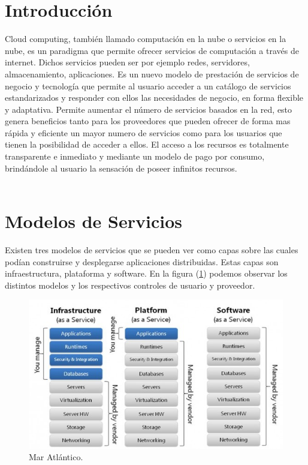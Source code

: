 \section{Introducción}
Cloud computing, también llamado computación en la nube o servicios en la nube, es un paradigma que permite ofrecer servicios de computación a través de internet. Dichos servicios pueden ser por ejemplo redes, servidores, almacenamiento, aplicaciones.
Es un nuevo modelo de prestación de servicios de negocio y tecnología que permite al usuario acceder a un catálogo de servicios estandarizados y responder con ellos las necesidades de negocio, en forma flexible y adaptativa. 
Permite aumentar el número de servicios basados en la red, esto genera beneficios tanto para los proveedores que pueden ofrecer de forma mas rápida y eficiente un mayor numero de servicios como para los usuarios que tienen la posibilidad de acceder a ellos. El acceso a los recursos es totalmente transparente e inmediato y mediante un modelo de pago por consumo, brindándole al usuario la sensación de poseer infinitos recursos.  
\\
\\
\section{Modelos de Servicios}
Existen tres modelos de servicios que se pueden ver como capas sobre las cuales podían construirse y desplegarse aplicaciones distribuidas. Estas capas son infraestructura, plataforma y software. En la figura  (\ref{fig:Modelo_servicios}) podemos observar los distintos modelos y los respectivos controles de usuario y proveedor. 
\\

\begin{figure}[h!]
\centering
\includegraphics[width=\columnwidth, keepaspectratio]{_imagenes/Modelo_servicios.jpg}
\caption{Mar Atlántico.} \label{fig:Modelo_servicios}
\end{figure}

